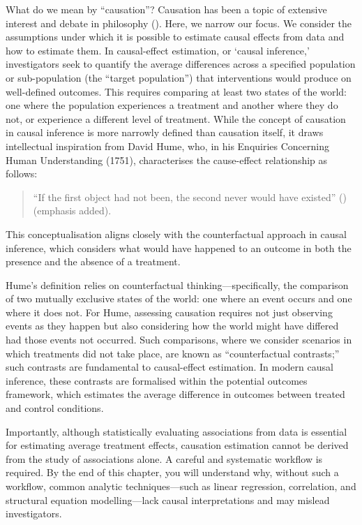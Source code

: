 \documentclass[
  singlecolumn]{article}
\begin{document}
What do we mean by ``causation''? Causation has been a topic of
extensive interest and debate in philosophy
(). Here, we narrow our focus. We
consider the assumptions under which it is possible to estimate causal
effects from data and how to estimate them. In causal-effect estimation,
or `causal inference,' investigators seek to quantify the average
differences across a specified population or sub-population (the
``target population'') that interventions would produce on well-defined
outcomes. This requires comparing at least two states of the world: one
where the population experiences a treatment and another where they do
not, or experience a different level of treatment. While the concept of
causation in causal inference is more narrowly defined than causation
itself, it draws intellectual inspiration from David Hume, who, in his
Enquiries Concerning Human Understanding (1751), characterises the
cause-effect relationship as follows:

\begin{quote}
``If the first object had not been, the second never would have
existed'' () (emphasis added).
\end{quote}

This conceptualisation aligns closely with the counterfactual approach
in causal inference, which considers what would have happened to an
outcome in both the presence and the absence of a treatment.

Hume's definition relies on counterfactual thinking---specifically, the
comparison of two mutually exclusive states of the world: one where an
event occurs and one where it does not. For Hume, assessing causation
requires not just observing events as they happen but also considering
how the world might have differed had those events not occurred. Such
comparisons, where we consider scenarios in which treatments did not
take place, are known as ``counterfactual contrasts;'' such contrasts
are fundamental to causal-effect estimation. In modern causal inference,
these contrasts are formalised within the potential outcomes framework,
which estimates the average difference in outcomes between treated and
control conditions.

Importantly, although statistically evaluating associations from data is
essential for estimating average treatment effects, causation estimation
cannot be derived from the study of associations alone. A careful and
systematic workflow is required. By the end of this chapter, you will
understand why, without such a workflow, common analytic
techniques---such as linear regression, correlation, and structural
equation modelling---lack causal interpretations and may mislead
investigators.
\end{document}

